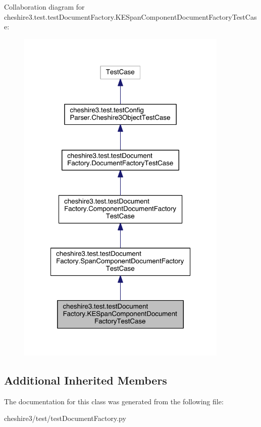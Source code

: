 Collaboration diagram for cheshire3.\-test.\-test\-Document\-Factory.\-K\-E\-Span\-Component\-Document\-Factory\-Test\-Case\-:
\nopagebreak
\begin{figure}[H]
\begin{center}
\leavevmode
\includegraphics[width=286pt]{classcheshire3_1_1test_1_1test_document_factory_1_1_k_e_span_component_document_factory_test_case__coll__graph}
\end{center}
\end{figure}
\subsection*{Additional Inherited Members}


The documentation for this class was generated from the following file\-:\begin{DoxyCompactItemize}
\item 
cheshire3/test/test\-Document\-Factory.\-py\end{DoxyCompactItemize}
